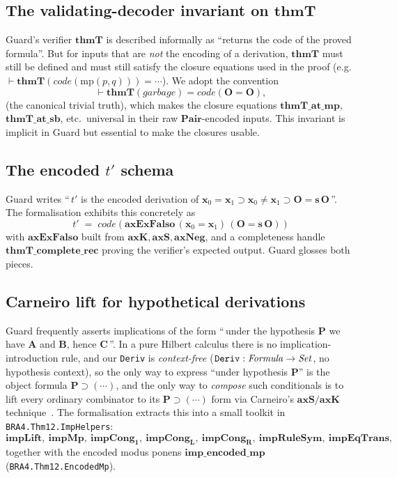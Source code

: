\documentclass[11pt]{article}
\theoremstyle{plain}
\theoremstyle{definition}
\theoremstyle{remark}
\newcommand{\code}[1]{\mathit{code}(#1)}
\newcommand{\thmT}{\mathbf{thmT}}
\newcommand{\Pair}{\mathbf{Pair}}
\begin{document}
\subsection{The validating-decoder invariant on $\thmT$}

Guard's verifier $\thmT$ is described informally as ``returns the code
of the proved formula''.  But for inputs that are \emph{not} the
encoding of a derivation, $\thmT$ must still be defined and must still
satisfy the closure equations used in the proof (e.g.\
$\vdash \thmT(\code{\mathrm{mp}(p,q)}) = \cdots$).  We adopt the
convention
\[
\vdash \thmT(\mathit{garbage}) = \code{\mathbf{O} = \mathbf{O}},
\]
(the canonical trivial truth), which makes the closure equations
$\mathbf{thmT\_at\_mp}$, $\mathbf{thmT\_at\_sb}$, etc.\ universal in
their raw $\Pair$-encoded inputs.  This invariant is implicit in Guard
but essential to make the closures usable.

\subsection{The encoded $t'$ schema}

Guard writes ``\,$t'$ is the encoded derivation of $\mathbf{x}_0 =
\mathbf{x}_1 \supset \mathbf{x}_0 \neq \mathbf{x}_1 \supset \mathbf{O}
= \mathbf{s}\,\mathbf{O}$\,''.  The formalisation exhibits this
concretely as
\[
t' \;=\; \code{\mathbf{axExFalso}\,(\mathbf{x}_0 = \mathbf{x}_1)\,(\mathbf{O} = \mathbf{s}\,\mathbf{O})}
\]
with $\mathbf{axExFalso}$ built from $\mathbf{axK}, \mathbf{axS},
\mathbf{axNeg}$, and a completeness handle
$\mathbf{thmT\_complete\_rec}$ proving the verifier's expected output.
Guard glosses both pieces.

\subsection{Carneiro lift for hypothetical derivations}
\label{sec:carneiro}

Guard frequently asserts implications of the form ``\,under the
hypothesis $\mathbf{P}$ we have $\mathbf{A}$ and $\mathbf{B}$, hence
$\mathbf{C}$\,''.  In a pure Hilbert calculus there is no
implication-introduction rule, and our \verb|Deriv| is
\emph{context-free} ($\verb|Deriv| : \mathit{Formula} \to \mathit{Set}$,
no hypothesis context), so the only way to express ``under hypothesis
$\mathbf{P}$'' is the object formula $\mathbf{P} \supset (\cdots)$, and
the only way to \emph{compose} such conditionals is to lift every
ordinary combinator to its $\mathbf{P} \supset (\cdots)$ form via
Carneiro's $\mathbf{axS}/\mathbf{axK}$ technique~\cite{Carneiro}.  The
formalisation extracts this into a small toolkit in
\verb|BRA4.Thm12.ImpHelpers|:
\[
\mathbf{impLift},\ \mathbf{impMp},\ \mathbf{impCong_1},\ \mathbf{impCong_L},\ \mathbf{impCong_R},\ \mathbf{impRuleSym},\ \mathbf{impEqTrans},
\]
together with the encoded modus ponens $\mathbf{imp\_encoded\_mp}$
(\verb|BRA4.Thm12.EncodedMp|).
\end{document}

